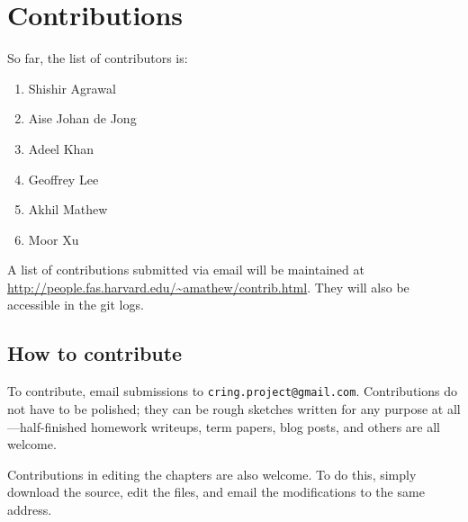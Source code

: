 \chapter*{Contributions}

So far, the list of contributors is:
\begin{enumerate}
\item Shishir Agrawal
\item Aise Johan de Jong
\item Adeel Khan 
\item Geoffrey Lee
\item Akhil Mathew
\item Moor Xu
\end{enumerate}

A list of contributions submitted via email will be maintained at 
\url{http://people.fas.harvard.edu/~amathew/contrib.html}.
They will also be accessible in the git logs. 

\section*{How to contribute}


To contribute, email submissions to \verb=cring.project@gmail.com=. 
Contributions do not have to be polished; they can be rough sketches written
for any purpose at all---half-finished homework writeups, term papers, blog
posts, and others are all welcome.

Contributions in editing the chapters are also welcome. To do this, simply
download the source, edit the files, and email the modifications to the same
address.


\fancyfoot[C]{\small \textbf{\thepage}}


